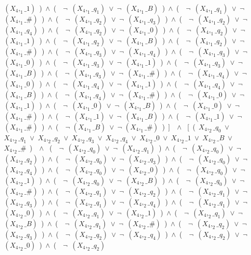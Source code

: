 ﻿\documentclass[a4paper,10pt]{article}
\begin{document}
$(X_4,_1\_1)$\ )\ $\wedge$\ (\ \ $\neg$\ $(X_4,_1\_q_1)$\ $\vee$\ $\neg$\ $(X_4,_1\_B)$\ )\ $\wedge$\ (\ \ $\neg$\ $(X_4,_1\_q_1)$\ $\vee$\ $\neg$\ $(X_4,_1\_\#)$\ )\ $\wedge$\ (\ \ $\neg$\ $(X_4,_1\_q_2)$\ $\vee$\ $\neg$\ $(X_4,_1\_q_3)$\ )\ $\wedge$\ (\ \ $\neg$\ $(X_4,_1\_q_2)$\ $\vee$\ $\neg$\ $(X_4,_1\_q_4)$\ )\ $\wedge$\ (\ \ $\neg$\ $(X_4,_1\_q_2)$\ $\vee$\ $\neg$\ $(X_4,_1\_0)$\ )\ $\wedge$\ (\ \ $\neg$\ $(X_4,_1\_q_2)$\ $\vee$\ $\neg$\ $(X_4,_1\_1)$\ )\ $\wedge$\ (\ \ $\neg$\ $(X_4,_1\_q_2)$\ $\vee$\ $\neg$\ $(X_4,_1\_B)$\ )\ $\wedge$\ (\ \ $\neg$\ $(X_4,_1\_q_2)$\ $\vee$\ $\neg$\ $(X_4,_1\_\#)$\ )\ $\wedge$\ (\ \ $\neg$\ $(X_4,_1\_q_3)$\ $\vee$\ $\neg$\ $(X_4,_1\_q_4)$\ )\ $\wedge$\ (\ \ $\neg$\ $(X_4,_1\_q_3)$\ $\vee$\ $\neg$\ $(X_4,_1\_0)$\ )\ $\wedge$\ (\ \ $\neg$\ $(X_4,_1\_q_3)$\ $\vee$\ $\neg$\ $(X_4,_1\_1)$\ )\ $\wedge$\ (\ \ $\neg$\ $(X_4,_1\_q_3)$\ $\vee$\ $\neg$\ $(X_4,_1\_B)$\ )\ $\wedge$\ (\ \ $\neg$\ $(X_4,_1\_q_3)$\ $\vee$\ $\neg$\ $(X_4,_1\_\#)$\ )\ $\wedge$\ (\ \ $\neg$\ $(X_4,_1\_q_4)$\ $\vee$\ $\neg$\ $(X_4,_1\_0)$\ )\ $\wedge$\ (\ \ $\neg$\ $(X_4,_1\_q_4)$\ $\vee$\ $\neg$\ $(X_4,_1\_1)$\ )\ $\wedge$\ (\ \ $\neg$\ $(X_4,_1\_q_4)$\ $\vee$\ $\neg$\ $(X_4,_1\_B)$\ )\ $\wedge$\ (\ \ $\neg$\ $(X_4,_1\_q_4)$\ $\vee$\ $\neg$\ $(X_4,_1\_\#)$\ )\ $\wedge$\ (\ \ $\neg$\ $(X_4,_1\_0)$\ $\vee$\ $\neg$\ $(X_4,_1\_1)$\ )\ $\wedge$\ (\ \ $\neg$\ $(X_4,_1\_0)$\ $\vee$\ $\neg$\ $(X_4,_1\_B)$\ )\ $\wedge$\ (\ \ $\neg$\ $(X_4,_1\_0)$\ $\vee$\ $\neg$\ $(X_4,_1\_\#)$\ )\ $\wedge$\ (\ \ $\neg$\ $(X_4,_1\_1)$\ $\vee$\ $\neg$\ $(X_4,_1\_B)$\ )\ $\wedge$\ (\ \ $\neg$\ $(X_4,_1\_1)$\ $\vee$\ $\neg$\ $(X_4,_1\_\#)$\ )\ $\wedge$\ (\ \ $\neg$ $(X_4,_1\_B)$\ $\vee$\ $\neg$ $(X_4,_1\_\#)$\ )\ ]\ \ $\wedge$ \ [\ (\ $X_4,_2\_q_0$\ $\vee$\ $X_4,_2\_q_1$\ $\vee$\ $X_4,_2\_q_2$\ $\vee$\ $X_4,_2\_q_3$\ $\vee$\ $X_4,_2\_q_4$\ $\vee$\ $X_4,_2\_0$\ $\vee$\ $X_4,_2\_1$\ $\vee$\ $X_4,_2\_B$\ $\vee$\ $X_4,_2\_\#$\ )\ \ $\wedge$ \ (\ \ $\neg$\ $(X_4,_2\_q_0)$\ $\vee$\ $\neg$\ $(X_4,_2\_q_1)$\ )\ $\wedge$\ (\ \ $\neg$\ $(X_4,_2\_q_0)$\ $\vee$\ $\neg$\ $(X_4,_2\_q_2)$\ )\ $\wedge$\ (\ \ $\neg$\ $(X_4,_2\_q_0)$\ $\vee$\ $\neg$\ $(X_4,_2\_q_3)$\ )\ $\wedge$\ (\ \ $\neg$\ $(X_4,_2\_q_0)$\ $\vee$\ $\neg$\ $(X_4,_2\_q_4)$\ )\ $\wedge$\ (\ \ $\neg$\ $(X_4,_2\_q_0)$\ $\vee$\ $\neg$\ $(X_4,_2\_0)$\ )\ $\wedge$\ (\ \ $\neg$\ $(X_4,_2\_q_0)$\ $\vee$\ $\neg$\ $(X_4,_2\_1)$\ )\ $\wedge$\ (\ \ $\neg$\ $(X_4,_2\_q_0)$\ $\vee$\ $\neg$\ $(X_4,_2\_B)$\ )\ $\wedge$\ (\ \ $\neg$\ $(X_4,_2\_q_0)$\ $\vee$\ $\neg$\ $(X_4,_2\_\#)$\ )\ $\wedge$\ (\ \ $\neg$\ $(X_4,_2\_q_1)$\ $\vee$\ $\neg$\ $(X_4,_2\_q_2)$\ )\ $\wedge$\ (\ \ $\neg$\ $(X_4,_2\_q_1)$\ $\vee$\ $\neg$\ $(X_4,_2\_q_3)$\ )\ $\wedge$\ (\ \ $\neg$\ $(X_4,_2\_q_1)$\ $\vee$\ $\neg$\ $(X_4,_2\_q_4)$\ )\ $\wedge$\ (\ \ $\neg$\ $(X_4,_2\_q_1)$\ $\vee$\ $\neg$\ $(X_4,_2\_0)$\ )\ $\wedge$\ (\ \ $\neg$\ $(X_4,_2\_q_1)$\ $\vee$\ $\neg$\ $(X_4,_2\_1)$\ )\ $\wedge$\ (\ \ $\neg$\ $(X_4,_2\_q_1)$\ $\vee$\ $\neg$\ $(X_4,_2\_B)$\ )\ $\wedge$\ (\ \ $\neg$\ $(X_4,_2\_q_1)$\ $\vee$\ $\neg$\ $(X_4,_2\_\#)$\ )\ $\wedge$\ (\ \ $\neg$\ $(X_4,_2\_q_2)$\ $\vee$\ $\neg$\ $(X_4,_2\_q_3)$\ )\ $\wedge$\ (\ \ $\neg$\ $(X_4,_2\_q_2)$\ $\vee$\ $\neg$\ $(X_4,_2\_q_4)$\ )\ $\wedge$\ (\ \ $\neg$\ $(X_4,_2\_q_2)$\ $\vee$\ $\neg$\ $(X_4,_2\_0)$\ )\ $\wedge$\ (\ \ $\neg$\ $(X_4,_2\_q_2)$\ 
\end{document}
